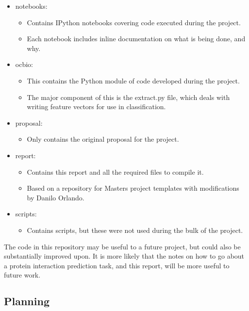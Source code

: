 \begin{itemize}
    \item notebooks:
        \begin{itemize}
            \item Contains IPython notebooks covering code executed during the project.
            \item Each notebook includes inline documentation on what is being done, and why.
        \end{itemize}
    \item ocbio:
        \begin{itemize}
            \item This contains the Python module of code developed during the project.
            \item The major component of this is the extract.py file, which deals with writing feature vectors for use in classification.
        \end{itemize}
    \item proposal:
        \begin{itemize}
            \item Only contains the original proposal for the project.
        \end{itemize}
    \item report:
        \begin{itemize}
            \item Contains this report and all the required files to compile it.
            \item Based on a repository for Masters project templates\autocite{ug4template} with modifications by Danilo Orlando.
        \end{itemize}
    \item scripts:
        \begin{itemize}
            \item Contains scripts, but these were not used during the bulk of the project.
        \end{itemize}
\end{itemize}

The code in this repository may be useful to a future project, but could also be substantially improved upon.
It is more likely that the notes on how to go about a protein interaction prediction task, and this report, will be more useful to future work.

\subsection{Planning}


